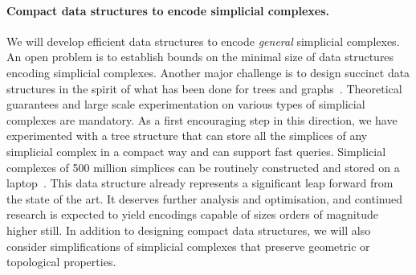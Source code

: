 \paragraph{Compact data structures to encode simplicial complexes.}  We will develop efficient data structures to encode {\em general} simplicial complexes. 
An open problem is to establish bounds on the minimal size of data structures encoding simplicial complexes. Another major challenge is to design succinct data structures
in the spirit of what has been done for trees and graphs~\cite{Ferragina:2005:SLT:1097112.1097456,Munro:2002:SRB:586840.586885}. 
 Theoretical guarantees and large scale experimentation on various
 types of simplicial complexes are mandatory. As a first encouraging
 step in this direction, we have experimented with a tree structure
 that can store all the simplices of any simplicial complex in a
 compact way and can support fast queries. Simplicial complexes of 500 million simplices can be routinely constructed and stored on a laptop~\cite{bm-dssc-2012}.  
This data structure already represents a significant leap forward from the state of the art. It deserves further analysis and optimisation, and continued research is expected to yield encodings capable of sizes orders of magnitude higher still.
In addition to designing compact data structures, we will also consider simplifications of simplicial complexes that preserve geometric or topological properties.










